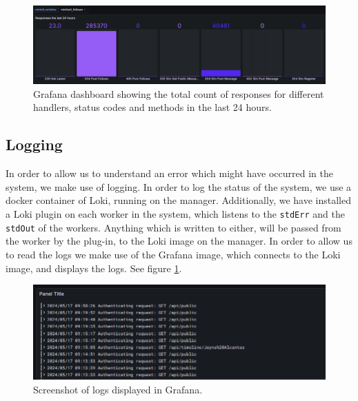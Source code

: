 \begin{figure}[H]
    \centering
    \includegraphics[scale=.33]{img/responses.png}
    \caption{Grafana dashboard showing the total count of responses for different handlers, status codes and methods in the last 24 hours.}
\end{figure}

\newpage
\subsection{Logging}
In order to allow us to understand an error which might have occurred in the system, we make use of logging. In order to log the status of the system, we use a docker container of Loki, running on the manager. Additionally, we have installed a Loki plugin on each worker in the system, which listens to the \texttt{stdErr} and the \texttt{stdOut} of the workers. Anything which is written to either, will be passed from the worker by the plug-in, to the Loki image on the manager. In order to allow us to read the logs we make use of the Grafana image, which connects to the Loki image, and displays the logs. See figure \ref{fig:loki in grafana}.

\begin{figure}[H]
    \centering
    \includegraphics[width=.8\linewidth]{img/Logs.png}
    \caption{Screenshot of logs displayed in Grafana.}
    \label{fig:loki in grafana}
\end{figure}

